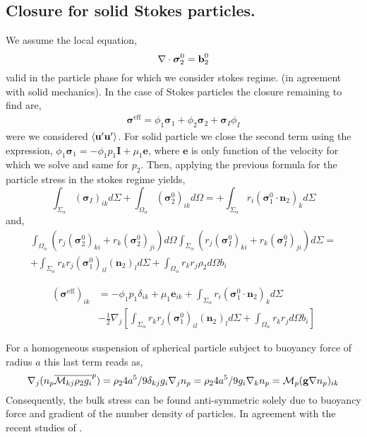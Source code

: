\subsection{Closure for solid Stokes particles. }
We assume the local equation, 
\begin{equation*}
    \mathbf{\nabla} \cdot \bm{\sigma}^0_2 = \textbf{b}_2^0
\end{equation*}
valid in the particle phase for which we consider stokes regime. (in agreement with solid mechanics).
In the case of Stokes particles the closure remaining to find are, 
\begin{align*}
    \bm{\sigma}^\text{eff}
    = \phi_1 \bm{\sigma}_1 + \phi_2 \bm{\sigma}_2  + \bm{\sigma}_I \phi_I 
\end{align*}
were we considered $\left<\textbf{u}'\textbf{u}'\right>$. 
For solid particle we close the second term using the expression, $\phi_1 \bm{\sigma}_1 = - \phi_1 p_1 \textbf{I} + \mu_1 \textbf{e}$, where $\textbf{e}$ is only function of the velocity for which we solve and same for $p_2$. 
Then, applying the previous formula for the particle stress in the stokes regime yields, 
\begin{equation}
    \int_{\Sigma_\alpha} 
    (\bm{\sigma}_I)_{ik}
    d\Sigma
    +\int_{\Omega_\alpha} 
    (\bm{\sigma}_2^0)_{ik}
    d\Omega
    = 
    +\int_{\Sigma_\alpha} 
     r_i (\bm{\sigma}_1^0 \cdot \textbf{n}_2)_{k}
    d\Sigma
\end{equation}
and, 
\begin{multline*}
    \int_{\Omega_\alpha} (r_{j}(\bm{\sigma}^0_2)_{ki}+r_{k}(\bm{\sigma}^0_2)_{ji})d\Omega
    \int_{\Sigma_\alpha} (r_{j}(\bm{\sigma}^0_I)_{ki}+r_{k}(\bm{\sigma}_I^0)_{ji})d\Sigma
    = \\
    +\int_{\Sigma_\alpha}  r_{k}r_{j} (\bm{\sigma}_1^0)_{il} (\textbf{n}_2)_l d\Sigma
    + \int_{\Omega_\alpha} r_{k}r_{j}  \rho_2 d\Omega b_i
\end{multline*}

\begin{align*}
    (\bm{\sigma}^\text{eff})_{ik}
    &=- \phi_1 p_1 \delta_{ik} + \mu_1 \textbf{e}_{ik}
    +\int_{\Sigma_\alpha} 
     r_i (\bm{\sigma}_1^0 \cdot \textbf{n}_2)_{k}
    d\Sigma\\
    &- \frac{1}{2}\nabla_j \left[
        \int_{\Sigma_\alpha}  r_{k}r_{j} (\bm{\sigma}_1^0)_{il} (\textbf{n}_2)_l d\Sigma
        + \int_{\Omega_\alpha} r_{k}r_{j}   d\Omega b_i
    \right]
\end{align*}


For a homogeneous suspension of spherical particle subject to buoyancy force of radius $a$ this last term reads as,
\begin{equation*}
    \mathbf{\nabla}_j (n_p\overline{\mathcal{M}_{kj}  \rho_2  g_i}^{p})
    = \rho_2 4 a^5/9 \delta_{kj} g_i \mathbf{\nabla}_j n_p
    = \rho_2 4 a^5/9 g_i \mathbf{\nabla}_k n_p
    = \mathcal{M}_p  (\textbf{g} \nabla n_p)_{ik}
\end{equation*}
Consequently, the bulk stress can be found anti-symmetric solely due to buoyancy force and gradient of the number density of particles. 
In agreement with the recent studies of \citet{wolgemuth2023continuum}.

